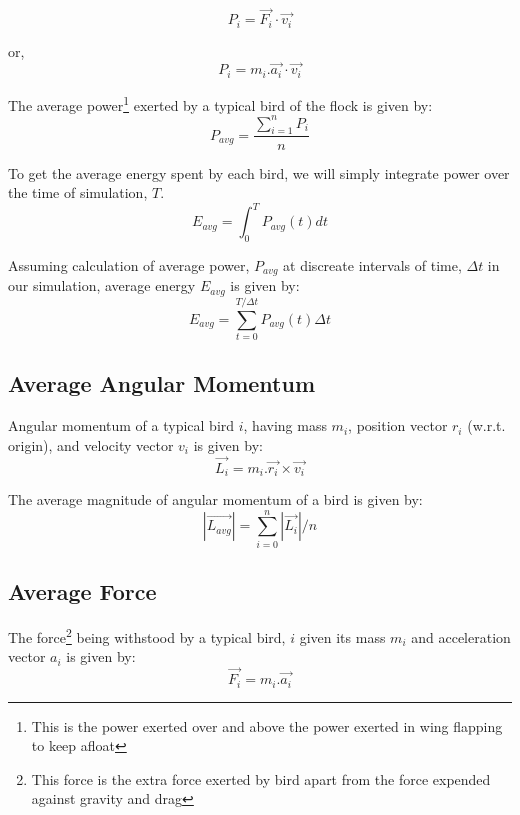 \documentclass[a4paper,12pt,openany]{book}
\begin{document}
\begin{equation}
P_i = \vec{F_i}\cdot\vec{v_i}
\end{equation}

or, \begin{equation}
P_i = m_i.\vec{a_i}\cdot\vec{v_i}
\end{equation}

The average power\footnote{This is the power exerted over and above the power exerted in wing flapping to keep afloat} exerted by a typical bird of the flock is given by:
\begin{equation}
P_{avg} = \frac{\sum_{i=1}^{n} P_i}{n}
\end{equation}

To get the average energy spent by each bird, we will simply integrate power over the time of simulation, $T$. 
\begin{equation}
E_{avg} = \int_{0}^{T} P_{avg}(t) dt
\end{equation}

Assuming calculation of average power, $P_{avg}$ at discreate intervals of time, $\Delta{t}$ in our simulation, average energy $E_{avg}$ is given by:
\begin{equation}
E_{avg} = \sum_{t=0}^{T/\Delta{t}} P_{avg}(t) \Delta{t}
\end{equation}

\subsection*{Average Angular Momentum}
Angular momentum of a typical bird $i$, having mass $m_i$, position vector $r_i$ (w.r.t. origin), and velocity vector $v_i$ is given by:
\begin{equation}
\vec{L_i} = m_i . \vec{r_i} \times \vec{v_i}
\end{equation} 

The average magnitude of angular momentum of a bird is given by:
\begin{equation}
|\vec{L_{avg}}| = \sum_{i=0}^{n} |\vec{L_i}| / n
\end{equation}

\subsection*{Average Force}
The force\footnote{This force is the extra force exerted by bird apart from the force expended against gravity and drag} being withstood by a typical bird, $i$ given its mass $m_i$ and acceleration vector $a_i$ is given by:
\begin{equation}
\vec{F_i} = m_i . \vec{a_i}
\end{equation}
\end{document}

